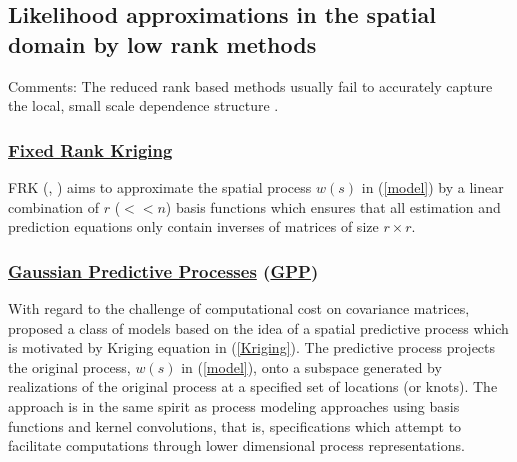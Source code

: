 \documentclass[
12pt, %
a4paper, %
oneside, %
headinclude,footinclude, %
BCOR5mm, %
]{scrartcl}
\begin{document}
\subsection{Likelihood approximations in the spatial domain by low rank methods}
\textcolor[rgb]{1.00,0.00,1.00}{Comments:}
The reduced rank based methods usually fail to accurately capture the local, small scale dependence structure \href{https://chenyw68.github.io/Literature/[2012]A full scale approximation of covariance functions for large spatial data sets.pdf}{\citep{sang2012full}}. 
\subsubsection{\href{https://chenyw68.github.io/Literature/[2017]An R Package for Spatial and Spatio-Temporal Prediction with Large Datasets(FRK).pdf}{Fixed Rank Kriging}}
FRK (\href{https://chenyw68.github.io/Literature/[2006]Spatial prediction for massive datasets.pdf}{\citep{cressie2006spatial}}, \href{https://chenyw68.github.io/Literature/[2008]Fixed rank kriging for very large spatial data sets.pdf}{\citep{cressie2008fixed}}) aims to approximate the spatial process $w(s)$ in (\ref{model}) by a linear combination of $r$ ($<< n$) basis functions which ensures that all estimation and prediction equations only contain inverses of matrices of size $r \times r$.
\subsubsection{\href{https://chenyw68.github.io/Literature/[2015]spBayes for Large Spatio-Temporal Data Models.pdf}{Gaussian Predictive Processes} (\href{https://chenyw68.github.io/Literature/[2020]Bayesian spatially varying coefficient models in the spBayes R package.pdf}{GPP})}
With regard to the challenge of computational cost on covariance matrices, \href{https://chenyw68.github.io/Literature/[2008]Gaussian predictive process models for large spatial data sets.pdf}{\citet{banerjee2008gaussian}} proposed a class of models based on the idea of a spatial predictive process which is motivated by Kriging equation in (\ref{Kriging}). The predictive process projects the original process, $w(s)$ in (\ref{model}), onto a subspace generated by realizations of the original process at a specified set of locations (or knots). The approach is in the same spirit as process modeling approaches using basis functions and kernel convolutions, that is, specifications which attempt to facilitate computations through lower dimensional process representations.
\end{document}
